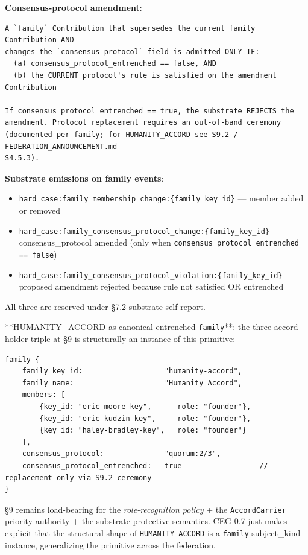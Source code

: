 \documentclass[10pt]{article}
\begin{document}
\textbf{Consensus-protocol amendment}:


\begin{lstlisting}
A `family` Contribution that supersedes the current family Contribution AND
changes the `consensus_protocol` field is admitted ONLY IF:
  (a) consensus_protocol_entrenched == false, AND
  (b) the CURRENT protocol's rule is satisfied on the amendment Contribution

If consensus_protocol_entrenched == true, the substrate REJECTS the
amendment. Protocol replacement requires an out-of-band ceremony
(documented per family; for HUMANITY_ACCORD see S9.2 / FEDERATION_ANNOUNCEMENT.md
S4.5.3).
\end{lstlisting}

\textbf{Substrate emissions on family events}:

\begin{itemize}\setlength\itemsep{0pt}
\item \texttt{hard\_case:family\_membership\_change:\{family\_key\_id\}} — member added or removed
\item \texttt{hard\_case:family\_consensus\_protocol\_change:\{family\_key\_id\}} — consensus\_protocol amended (only when \texttt{consensus\_protocol\_entrenched == false})
\item \texttt{hard\_case:family\_consensus\_protocol\_violation:\{family\_key\_id\}} — proposed amendment rejected because rule not satisfied OR entrenched
\end{itemize}


All three are reserved under §7.2 substrate-self-report.


**HUMANITY\_ACCORD as canonical entrenched-\texttt{family}**: the three accord-holder triple at §9 is structurally an instance of this primitive:


\begin{lstlisting}
family {
    family_key_id:                   "humanity-accord",
    family_name:                     "Humanity Accord",
    members: [
        {key_id: "eric-moore-key",      role: "founder"},
        {key_id: "eric-kudzin-key",     role: "founder"},
        {key_id: "haley-bradley-key",   role: "founder"}
    ],
    consensus_protocol:              "quorum:2/3",
    consensus_protocol_entrenched:   true                  // replacement only via S9.2 ceremony
}
\end{lstlisting}

§9 remains load-bearing for the \textit{role-recognition policy} + the \texttt{AccordCarrier} priority authority + the substrate-protective semantics. CEG 0.7 just makes explicit that the structural shape of \texttt{HUMANITY\_ACCORD} is a \texttt{family} subject\_kind instance, generalizing the primitive across the federation.
\end{document}
